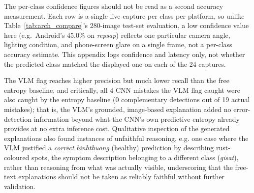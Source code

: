 The per-class confidence figures should not be read as a second accuracy measurement. Each row is a single live capture per class per platform, so unlike Table~\ref{tab:arch_compare}'s 280-image test-set evaluation, a low confidence value here (e.g.\ Android's 45.0\% on \textit{repsap}) reflects one particular camera angle, lighting condition, and phone-screen glare on a single frame, not a per-class accuracy estimate. This appendix logs confidence and latency only, not whether the predicted class matched the displayed one on each of the 24 captures.

The VLM flag reaches higher precision but much lower recall than the free entropy baseline, and critically, all 4 CNN mistakes the VLM flag caught were also caught by the entropy baseline (0 complementary detections out of 19 actual mistakes); that is, the VLM's grounded, image-based explanation added no error-detection information beyond what the CNN's own predictive entropy already provides at no extra inference cost. Qualitative inspection of the generated explanations also found instances of unfaithful reasoning, e.g. one case where the VLM justified a \emph{correct} \textit{binhthuong} (healthy) prediction by describing rust-coloured spots, the symptom description belonging to a different class (\textit{gisat}), rather than reasoning from what was actually visible, underscoring that the free-text explanations should not be taken as reliably faithful without further validation.